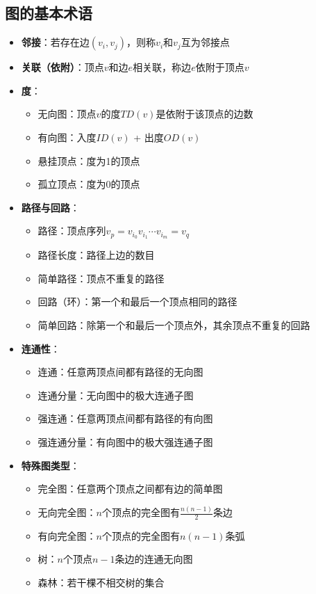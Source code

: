 \documentclass[12pt,a4paper]{amsart}
\begin{document}
\subsection{图的基本术语}

\begin{itemize}
    \item \textbf{邻接}：若存在边$(v_i, v_j)$，则称$v_i$和$v_j$互为邻接点
    \item \textbf{关联（依附）}：顶点$v$和边$e$相关联，称边$e$依附于顶点$v$
    \item \textbf{度}：
    \begin{itemize}
        \item 无向图：顶点$v$的度$TD(v)$是依附于该顶点的边数
        \item 有向图：入度$ID(v)$ + 出度$OD(v)$
        \item 悬挂顶点：度为1的顶点
        \item 孤立顶点：度为0的顶点
    \end{itemize}
    \item \textbf{路径与回路}：
    \begin{itemize}
        \item 路径：顶点序列$v_p = v_{i_0}v_{i_1}\cdots v_{i_m} = v_q$
        \item 路径长度：路径上边的数目
        \item 简单路径：顶点不重复的路径
        \item 回路（环）：第一个和最后一个顶点相同的路径
        \item 简单回路：除第一个和最后一个顶点外，其余顶点不重复的回路
    \end{itemize}
    \item \textbf{连通性}：
    \begin{itemize}
        \item 连通：任意两顶点间都有路径的无向图
        \item 连通分量：无向图中的极大连通子图
        \item 强连通：任意两顶点间都有路径的有向图
        \item 强连通分量：有向图中的极大强连通子图
    \end{itemize}
    \item \textbf{特殊图类型}：
    \begin{itemize}
        \item 完全图：任意两个顶点之间都有边的简单图
        \item 无向完全图：$n$个顶点的完全图有$\frac{n(n-1)}{2}$条边
        \item 有向完全图：$n$个顶点的完全图有$n(n-1)$条弧
        \item 树：$n$个顶点$n-1$条边的连通无向图
        \item 森林：若干棵不相交树的集合
    \end{itemize}
\end{itemize}
\end{document}
